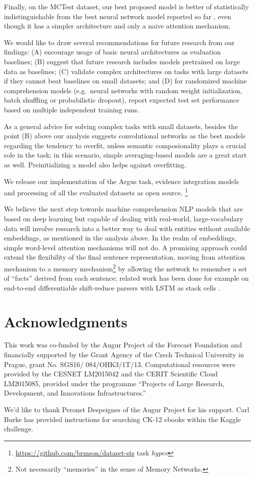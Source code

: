 \documentclass[11pt]{article}
\begin{document}
Finally, on the MCTest dataset, our best proposed model is better
of statistically
indistinguishable from the best neural network model reported so far
\cite{HABCNN},
even though it has a simpler architecture and only a naive attention
mechanism.

We would like to draw several recommendations for future research from our findings:
(A) encourage usage of basic neural architectures as evaluation baselines;
(B) suggest that future research includes models pretrained on large data as baselines;
(C) validate complex architectures on tasks with large datasets if they cannot beat baselines on small datasets; and
(D) for randomized machine comprehension models (e.g.\ neural networks with random weight
initialization, batch shuffling or probabilistic dropout), report expected test set performance
based on multiple independent training runs.

As a general advice for solving complex tasks with small datasets,
besides the point (B) above our analysis suggests convolutional networks
as the best models regarding the tendency to overfit, unless
semantic composionality plays a crucial role in the task;
in this scenario, simple averaging-based models are a great start as well.
Preinitializing a model also helps against overfitting.

We release our implementation of the Argus task, evidence integration
models and processing of all the evaluated datasets as open source.%
\footnote{\url{https://github.com/brmson/dataset-sts} task \textit{hypev}}

We believe the next step towards machine comprehension NLP models
that are based on deep learning but capable of dealing with real-world,
large-vocabulary data will involve research into a better way to deal with
entities without available embeddings, as mentioned in the analysis above.
In the realm of embeddings, simple word-level attention mechanisms will not do.
A promising approach could extend
the flexibility of the final sentence representation, moving from attention mechanism
to a memory mechanism\footnote{Not necessarily ``memories'' in the sense of Memory Networks.}
by allowing the network to remember a set of ``facts'' derived from each sentence;
related work has been done for example on end-to-end differentiable shift-reduce parsers
with LSTM as stack cells \cite{EndToEndParsing}.


\section*{Acknowledgments}
{\footnotesize
	This work was co-funded by the Augur Project of the Forecast Foundation
and financially supported by the Grant Agency of the Czech Technical
University in Prague, grant No. SGS16/ 084/OHK3/1T/13.
Computational resources were provided by the CESNET LM2015042 and the CERIT Scientific Cloud LM2015085,
provided under the programme ``Projects of Large Research, Development, and Innovations Infrastructures.''

We'd like to thank Peronet Despeignes of the Augur Project for his support.
Carl Burke has provided instructions for searching CK-12 ebooks within
the Kaggle challenge.}



\end{document}
